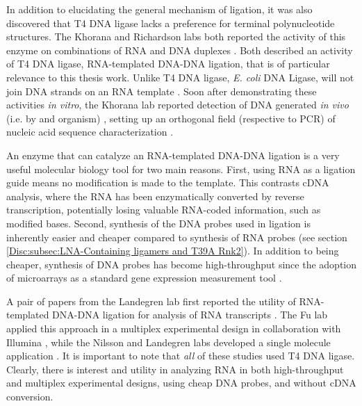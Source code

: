     In addition to elucidating the general mechanism of ligation, it was also discovered that T4 DNA ligase lacks a preference for terminal polynucleotide structures. The Khorana and Richardson labs both reported the activity of this enzyme on combinations of RNA and DNA duplexes \citep{Fareed1971, Kleppe1970b}. Both described an activity of T4 DNA ligase, RNA-templated DNA-DNA ligation, that is of particular relevance to this thesis work. Unlike T4 DNA ligase, \textit{E. coli} DNA Ligase, will not join DNA strands on an RNA template \citep{Bullard2006}. Soon after demonstrating these activities \textit{in vitro}, the Khorana lab reported detection of DNA generated \textit{in vivo} (i.e. by and organism) \citep{Besmer1972b}, setting up an orthogonal field (respective to PCR) of nucleic acid sequence characterization \citep{Conze2009c}.

    An enzyme that can catalyze an RNA-templated DNA-DNA ligation is a very useful molecular biology tool for two main reasons. First, using RNA as a ligation guide means no modification is made to the template. This contrasts cDNA analysis, where the RNA has been enzymatically converted by reverse transcription, potentially losing valuable RNA-coded information, such as modified bases. Second, synthesis of the DNA probes used in ligation is inherently easier and cheaper compared to synthesis of RNA probes (see section \ref{Disc:subsec:LNA-Containing ligamers and T39A Rnk2}). In addition to being cheaper, synthesis of DNA probes has become high-throughput since the adoption of microarrays as a standard gene expression measurement tool \citep{Schena1995a}.

    A pair of papers from the Landegren lab first reported the utility of RNA-templated DNA-DNA ligation for analysis of RNA transcripts \citep{Nilsson2000,Nilsson2001}. The Fu lab applied this approach in a multiplex experimental design in collaboration with Illumina \citep{Li2012c,Yeakley2002}, while the Nilsson and Landegren labs developed a single molecule application \citep{Conze2010}. It is important to note that \textit{all} of these studies used T4 DNA ligase. Clearly, there is interest and utility in analyzing RNA in both high-throughput and multiplex experimental designs, using cheap DNA probes, and without cDNA conversion.

